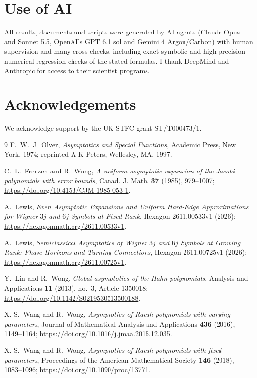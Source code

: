 \documentclass[11pt]{article}
\theoremstyle{definition}
\theoremstyle{remark}
\renewcommand{\_}{\oldunderscore\penalty0\hskip0pt\relax}
\begin{document}
\section*{Use of AI}
All results, documents and scripts were generated by AI agents (Claude Opus and Sonnet 5.5, OpenAI's GPT 6.1 sol and Gemini 4 Argon/Carbon)
with human supervision and many cross-checks, including exact symbolic and high-precision numerical regression checks of the stated formulas.
I thank DeepMind and Anthropic for access to their scientist programs.

\section*{Acknowledgements}
We acknowledge support by the UK STFC grant ST/T000473/1.

\begin{thebibliography}{9}
\footnotesize
{}
F.~W.~J.~Olver, \emph{Asymptotics and Special Functions}, Academic Press, New York, 1974; reprinted A K Peters, Wellesley, MA, 1997.

C.~L.~Frenzen and R.~Wong, \emph{A uniform asymptotic expansion of the Jacobi polynomials with error bounds}, Canad. J. Math.
  \textbf{37} (1985), 979--1007; \url{https://doi.org/10.4153/CJM-1985-053-1}.

A.~Lewis, \emph{Even Asymptotic Expansions and Uniform Hard-Edge Approximations for Wigner $3j$ and $6j$ Symbols at Fixed Rank},
Hexagon 2611.00533v1 (2026); \url{https://hexagonmath.org/2611.00533v1}.

A.~Lewis, \emph{Semiclassical Asymptotics of Wigner $3j$ and $6j$ Symbols at Growing Rank: Phase Horizons and Turning Connections},
Hexagon 2611.00725v1 (2026); \url{https://hexagonmath.org/2611.00725v1}.

Y.~Lin and R.~Wong, \emph{Global asymptotics of the Hahn polynomials}, Analysis and Applications \textbf{11} (2013), no.~3,
  Article 1350018; \url{https://doi.org/10.1142/S0219530513500188}.

X.-S.~Wang and R.~Wong, \emph{Asymptotics of Racah polynomials with varying parameters}, Journal of Mathematical Analysis and
  Applications \textbf{436} (2016), 1149--1164; \url{https://doi.org/10.1016/j.jmaa.2015.12.035}.

X.-S.~Wang and R.~Wong, \emph{Asymptotics of Racah polynomials with fixed parameters}, Proceedings of the American Mathematical
  Society \textbf{146} (2018), 1083--1096; \url{https://doi.org/10.1090/proc/13771}.


\end{thebibliography}
\end{document}
